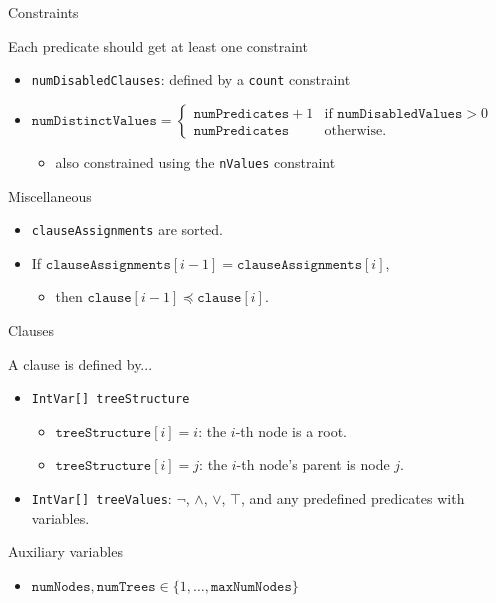 \documentclass{beamer}
\begin{document}
\begin{frame}{Constraints}
  \begin{block}{Each predicate should get at least one constraint}
    \begin{itemize}
    \item \texttt{numDisabledClauses}: defined by a \texttt{count} constraint
    \item $\texttt{numDistinctValues} = \begin{cases}
        \texttt{numPredicates} + 1 & \text{if } \texttt{numDisabledValues} > 0 \\
        \texttt{numPredicates} & \text{otherwise.}
      \end{cases}$
      \begin{itemize}
      \item also constrained using the \texttt{nValues} constraint
      \end{itemize}
    \end{itemize}
  \end{block}
  \begin{block}{Miscellaneous}
    \begin{itemize}
    \item \texttt{clauseAssignments} are sorted.
    \item If $\texttt{clauseAssignments}[i-1] = \texttt{clauseAssignments}[i]$,
      \begin{itemize}
      \item then $\texttt{clause}[i-1] \preceq \texttt{clause}[i]$.
      \end{itemize}
    \end{itemize}
  \end{block}
\end{frame}

\begin{frame}{Clauses}
  \begin{block}{A clause is defined by...}
    \begin{itemize}
    \item \texttt{IntVar[] treeStructure}
      \begin{itemize}
      \item $\texttt{treeStructure}[i] = i$: the $i$-th node is a root.
      \item $\texttt{treeStructure}[i] = j$: the $i$-th node's parent is node $j$.
      \end{itemize}
    \item \texttt{IntVar[] treeValues}: $\neg$, $\land$, $\lor$, $\top$, and any
      predefined predicates with variables.
    \end{itemize}
  \end{block}
  \begin{block}{Auxiliary variables}
    \begin{itemize}
    \item $\texttt{numNodes}, \texttt{numTrees} \in \{ 1, \dots, \texttt{maxNumNodes} \}$
    \end{itemize}
  \end{block}
\end{frame}
\end{document}
